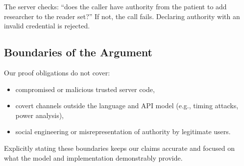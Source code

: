 The server checks: ``does the caller have authority from the patient to add researcher to the reader set?'' If not, the call fails. Declaring authority with an invalid credential is rejected. \checkmark

\subsection{Boundaries of the Argument}

Our proof obligations do not cover:
\begin{itemize}
    \item compromised or malicious trusted server code,
    \item covert channels outside the language and API model (e.g., timing attacks, power analysis),
    \item social engineering or misrepresentation of authority by legitimate users.
\end{itemize}

Explicitly stating these boundaries keeps our claims accurate and focused on what the model and implementation demonstrably provide.

